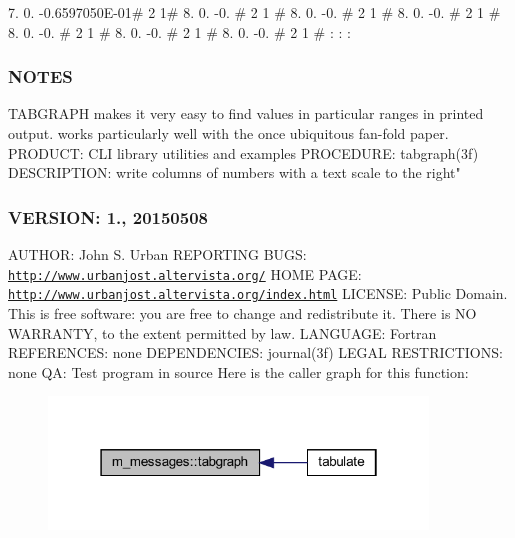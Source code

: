 7. 0. -\/0.\+6597050E-\/01\# 2 1\# 8. 0. -\/0. \# 2 1 \# 8. 0. -\/0. \# 2 1 \# 8. 0. -\/0. \# 2 1 \# 8. 0. -\/0. \# 2 1 \# 8. 0. -\/0. \# 2 1 \# 8. 0. -\/0. \# 2 1 \# \+: \+: \+:

\subsubsection*{N\+O\+T\+ES}

T\+A\+B\+G\+R\+A\+PH makes it very easy to find values in particular ranges in printed output. works particularly well with the once ubiquitous fan-\/fold paper. P\+R\+O\+D\+U\+CT\+: C\+LI library utilities and examples P\+R\+O\+C\+E\+D\+U\+RE\+: tabgraph(3f) D\+E\+S\+C\+R\+I\+P\+T\+I\+ON\+: write columns of numbers with a text scale to the right" \subsubsection*{V\+E\+R\+S\+I\+ON\+: 1., 20150508}

A\+U\+T\+H\+OR\+: John S. Urban R\+E\+P\+O\+R\+T\+I\+NG B\+U\+GS\+: \href{http://www.urbanjost.altervista.org/}{\tt http\+://www.\+urbanjost.\+altervista.\+org/} H\+O\+ME P\+A\+GE\+: \href{http://www.urbanjost.altervista.org/index.html}{\tt http\+://www.\+urbanjost.\+altervista.\+org/index.\+html} L\+I\+C\+E\+N\+SE\+: Public Domain. This is free software\+: you are free to change and redistribute it. There is NO W\+A\+R\+R\+A\+N\+TY, to the extent permitted by law. L\+A\+N\+G\+U\+A\+GE\+: Fortran R\+E\+F\+E\+R\+E\+N\+C\+ES\+: none D\+E\+P\+E\+N\+D\+E\+N\+C\+I\+ES\+: journal(3f) L\+E\+G\+AL R\+E\+S\+T\+R\+I\+C\+T\+I\+O\+NS\+: none QA\+: Test program in source Here is the caller graph for this function\+:
\nopagebreak
\begin{figure}[H]
\begin{center}
\leavevmode
\includegraphics[width=286pt]{namespacem__messages_acc516fb8a4dd9eede3abb535ff7496e0_icgraph}
\end{center}
\end{figure}
